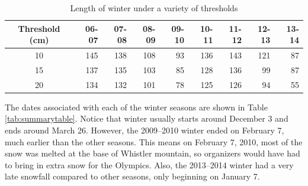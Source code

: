 \documentclass[12pt,twoside]{article}
\begin{document}
{%
\begin{table}[ht]
\centering
\begin{tabular}{c|rrrrrrrr}
  \hline
Threshold (cm) & 06-07 & 07-08 & 08-09 & 09-10 & 10-11 & 11-12 & 12-13 & 13-14 \\ 
  \hline
10 & 145 & 138 & 108 & 93 & 136 & 143 & 121 & 87 \\ 
  15 & 137 & 135 & 103 & 85 & 128 & 136 & 99 & 87 \\ 
  20 & 134 & 132 & 101 & 78 & 125 & 126 & 94 & 55 \\ 
   \hline
\end{tabular}
\caption{Length of winter under a variety of thresholds} 
\label{tab:robustcheck}
\end{table}
\medskip
The dates associated with each of the winter  seasons are shown in Table \ref{tab:summarytable}. Notice that winter usually starts around December 3 and ends around March 26. However, the 2009--2010 winter ended on February 7, much earlier than the other seasons. This means on February 7, 2010, most of the snow was melted at the base of Whistler mountain, so organizers would have had to bring in extra snow for the Olympics. Also, the 2013--2014 winter had a very late snowfall compared to other seasons, only beginning on January 7.

}
\end{document}
